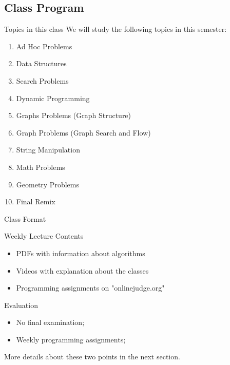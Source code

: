 \subsection{Class Program}
\begin{frame}{Topics in this class}
  We will study the following topics in this semester:

  \begin{enumerate}
    \item Ad Hoc Problems
    \item Data Structures
    \item Search Problems
    \item Dynamic Programming
    \item Graphs Problems (Graph Structure)
    \item Graph Problems (Graph Search and Flow)
    \item String Manipulation
    \item Math Problems
    \item Geometry Problems
    \item Final Remix
  \end{enumerate}
\end{frame}

\begin{frame}{Class Format}
  \begin{block}{Weekly Lecture Contents}
    \begin{itemize}
      \item PDFs with information about algorithms
      \item Videos with explanation about the classes
      \item Programming assignments on "onlinejudge.org"
    \end{itemize}
  \end{block}

  \begin{exampleblock}{Evaluation}
    \begin{itemize}
      \item No final examination;
      \item Weekly programming assignments;
    \end{itemize}
  \end{exampleblock}
  \bigskip

  More details about these two points in the next section.
\end{frame}

